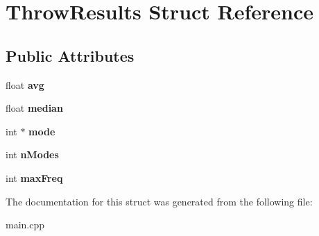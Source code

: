\hypertarget{struct_throw_results}{\section{Throw\+Results Struct Reference}
\label{struct_throw_results}
}
\subsection*{Public Attributes}
\begin{DoxyCompactItemize}
\item 
\hypertarget{struct_throw_results_adb1b2c3df923a0d475893660f5a02335}{float {\bfseries avg}}\label{struct_throw_results_adb1b2c3df923a0d475893660f5a02335}

\item 
\hypertarget{struct_throw_results_a5787e1fb78d5a40032987c03663e115d}{float {\bfseries median}}\label{struct_throw_results_a5787e1fb78d5a40032987c03663e115d}

\item 
\hypertarget{struct_throw_results_a59a84806bbe37cc26c50b908a16e05d3}{int $\ast$ {\bfseries mode}}\label{struct_throw_results_a59a84806bbe37cc26c50b908a16e05d3}

\item 
\hypertarget{struct_throw_results_a24bae5f8fce6933e2f6aa9e7f5ae4341}{int {\bfseries n\+Modes}}\label{struct_throw_results_a24bae5f8fce6933e2f6aa9e7f5ae4341}

\item 
\hypertarget{struct_throw_results_aeb6e628a45838285b3540de1d9b0a291}{int {\bfseries max\+Freq}}\label{struct_throw_results_aeb6e628a45838285b3540de1d9b0a291}

\end{DoxyCompactItemize}


The documentation for this struct was generated from the following file\+:\begin{DoxyCompactItemize}
\item 
main.\+cpp\end{DoxyCompactItemize}
